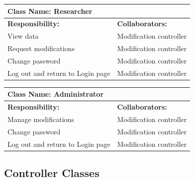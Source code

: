 \documentclass[]{article}
\begin{document}
		\centering
		\begin{tabular}{|p{7cm}|p{7cm}|}
		\hline 
		 \multicolumn{2}{|l|}{\textbf{Class Name: Researcher}} \\
		\hline
		\textbf{Responsibility:} & \textbf{Collaborators:} \\
		\hline
		View data & Modification controller \\
		\hline
		Request modifications &  Modification controller \\
		\hline
		Change password &  Modification controller \\
		\hline
		Log out and return to Login page &  Modification controller\\
		\hline
		\end{tabular}
	\newline
	\vspace*{0.5 cm}
	\newline

		\centering
		\begin{tabular}{|p{7cm}|p{7cm}|}
		\hline 
		 \multicolumn{2}{|l|}{\textbf{Class Name: Administrator}} \\
		\hline
		\textbf{Responsibility:} & \textbf{Collaborators:} \\
		\hline
		Manage modifications & Modification controller \\
		\hline
		Change password &  Modification controller \\
		\hline
		Log out and return to Login page &  Modification controller\\
		\hline
		\end{tabular}
	\newline
	\vspace*{0.5 cm}
	\newline

\subsection{Controller Classes}
\end{document}
